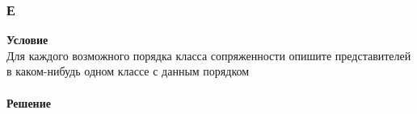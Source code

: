 			
			\subsubsection*{Е}
			\textbf{Условие}\\
			Для каждого возможного порядка класса сопряженности опишите представителей в каком-нибудь одном классе с данным порядком\\
			\\
			\textbf{Решение}\\
			
			